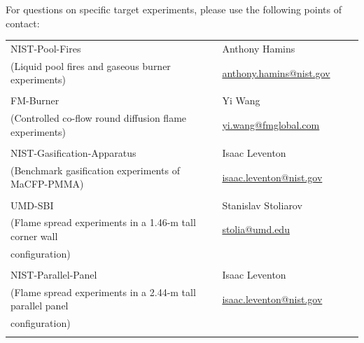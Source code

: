 \documentclass[12pt]{article}
\begin{document}
\noindent For questions on specific target experiments, please use the following points of contact:
\begin{table}[htb]
\begin{tabular}{|p{0.6\linewidth} | p{0.4\linewidth}|}
\hline
NIST-Pool-Fires           & Anthony Hamins\\
(Liquid pool fires and gaseous burner experiments)& \href{mailto:anthony.hamins@nist.gov}{anthony.hamins@nist.gov}\\
&\\
\hline
FM-Burner & Yi Wang\\
(Controlled co-flow round diffusion flame experiments)& \href{mailto:yi.wang@fmglobal.com}{yi.wang@fmglobal.com}\\
&\\
\hline
NIST-Gasification-Apparatus & Isaac Leventon \\
(Benchmark gasification experiments of MaCFP-PMMA)&\href{mailto:isaac.leventon@nist.gov}{isaac.leventon@nist.gov}\\
&\\
\hline
UMD-SBI & Stanislav Stoliarov \\
(Flame spread experiments in a 1.46-m tall corner wall &\href{mailto:stolia@umd.edu}{stolia@umd.edu}\\
configuration)&\\
&\\
\hline
NIST-Parallel-Panel &Isaac Leventon \\
(Flame spread experiments in a 2.44-m tall parallel panel&\href{mailto:isaac.leventon@nist.gov}{isaac.leventon@nist.gov}\\
configuration)& \\
& \\
\hline
\end{tabular}
\end{table}


 \clearpage

\end{document}
